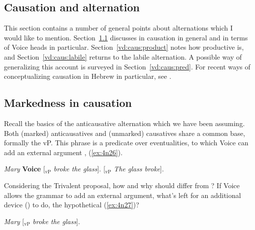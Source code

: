 \begin{exe}
\begin{xlist}
\begin{xlist}
\begin{exe}
\begin{exe}
\begin{xlist}
\begin{exe}
\begin{xlist}
\begin{exe}
\begin{xlist}
\begin{xlist}
\begin{exe}
\begin{xlist}
\begin{exe}
\begin{xlist}
\begin{exe}
\begin{exe}
\begin{exe}
\begin{xlist}
\begin{exe}
\begin{exe}
\begin{xlist}
\begin{xlist}
\begin{exe}
\begin{xlist}
\begin{exe}
\begin{exe}
\begin{exe}
\begin{xlist}
\begin{exe}
\begin{exe}
\begin{xlist}
\begin{exe}
\begin{xlist}
\begin{exe}
\begin{xlist}
\section{Causation and alternation} \label{vd:caus}
This section contains a number of general points about  alternations which I would like to mention. Section~\ref{vd:caus:mrkd} discusses  in causation in general and in terms of Voice heads in particular. Section~\ref{vd:caus:product} notes how productive {\vd} is, and Section~\ref{vd:caus:labile} returns to the labile alternation. A possible way of generalizing this account is surveyed in Section~\ref{vd:caus:pred}. For recent ways of conceptualizing causation in Hebrew in particular, see \cite{barashersiegalboneh18wccfl}.

	\subsection{Markedness in causation} \label{vd:caus:mrkd}
Recall the basics of the anticausative alternation which we have been assuming. Both (marked) anticausatives and (unmarked) causatives share a common base, formally the vP. This phrase is a predicate over eventualities, to which Voice can add an external argument \citep{schaefer08,layering15}, (\ref{ex:4n26}).
 \begin{exe}
 \ex   \label{ex:4n26}
 \begin{xlist} 
 	\ex  \emph{Mary} \textbf{Voice} [$_{\text{vP}}$ \emph{broke the glass}]. 
 	\ex  {\zero} \textbf{\vz} [$_{\text{vP}}$ \emph{The glass broke}]. 
 \z
\z 

Considering the Trivalent proposal, how and why should {\vd} differ from ? If Voice allows the grammar to add an external argument, what's left for an additional device (\vd) to do, the hypothetical (\ref{ex:4n27})?
 \begin{exe}
\ex  \label{ex:4n27}\emph{Mary} \textbf{\vd} [$_{\text{vP}}$ \emph{broke the glass}]. 
 \z 


\end{exe}
\end{xlist}
\end{exe}
\end{xlist}
\end{exe}
\end{xlist}
\end{exe}
\end{xlist}
\end{exe}
\end{exe}
\end{xlist}
\end{exe}
\end{exe}
\end{exe}
\end{xlist}
\end{exe}
\end{xlist}
\end{xlist}
\end{exe}
\end{exe}
\end{xlist}
\end{exe}
\end{exe}
\end{exe}
\end{xlist}
\end{exe}
\end{xlist}
\end{exe}
\end{xlist}
\end{xlist}
\end{exe}
\end{xlist}
\end{exe}
\end{xlist}
\end{exe}
\end{exe}
\end{xlist}
\end{xlist}
\end{exe}
